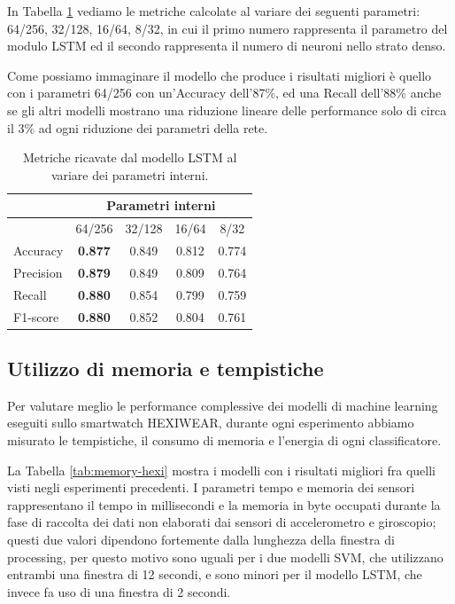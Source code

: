 In Tabella \ref{tab:metrics-lstm-param-hexi} vediamo le metriche calcolate al variare dei seguenti parametri: 64/256, 32/128, 16/64, 8/32, in cui il primo numero rappresenta il parametro del modulo LSTM ed il secondo rappresenta il numero di neuroni nello strato denso. 

Come possiamo immaginare il modello che produce i risultati migliori è quello con i parametri 64/256 con un'Accuracy dell'87\%, ed una Recall dell'88\% anche se gli altri modelli mostrano una riduzione lineare delle performance solo di circa il 3\% ad ogni riduzione dei parametri della rete.

\begin{table}
    \centering
    \begin{tabular}{l c c c c}
        \hline
        & \multicolumn{4}{c}{Parametri interni} \\
        \hline
        & 64/256 & 32/128 & 16/64 & 8/32 \\
        \hline
        Accuracy & \textbf{0.877} & 0.849 & 0.812 & 0.774 \\
        Precision & \textbf{0.879} & 0.849 & 0.809 & 0.764 \\
        Recall & \textbf{0.880} & 0.854 & 0.799 & 0.759 \\
        F1-score & \textbf{0.880} & 0.852 & 0.804 & 0.761 \\
        \hline
    \end{tabular}
    \caption{Metriche ricavate dal modello LSTM al variare dei parametri interni.}
    \label{tab:metrics-lstm-param-hexi}
\end{table}

\subsection{Utilizzo di memoria e tempistiche}
\label{ssec:utilizzo-di-memoria-e-tempistiche-hexi}

Per valutare meglio le performance complessive dei modelli di machine learning eseguiti sullo smartwatch HEXIWEAR, durante ogni esperimento abbiamo misurato le tempistiche, il consumo di memoria e l'energia di ogni classificatore.

La Tabella \ref{tab:memory-hexi} mostra i modelli con i risultati migliori fra quelli visti negli esperimenti precedenti. I parametri tempo e memoria dei sensori rappresentano il tempo in millisecondi e la memoria in byte occupati durante la fase di raccolta dei dati non elaborati dai sensori di accelerometro e giroscopio; questi due valori dipendono fortemente dalla lunghezza della finestra di processing, per questo motivo sono uguali per i due modelli SVM, che utilizzano entrambi una finestra di 12 secondi, e sono minori per il modello LSTM, che invece fa uso di una finestra di 2 secondi.

